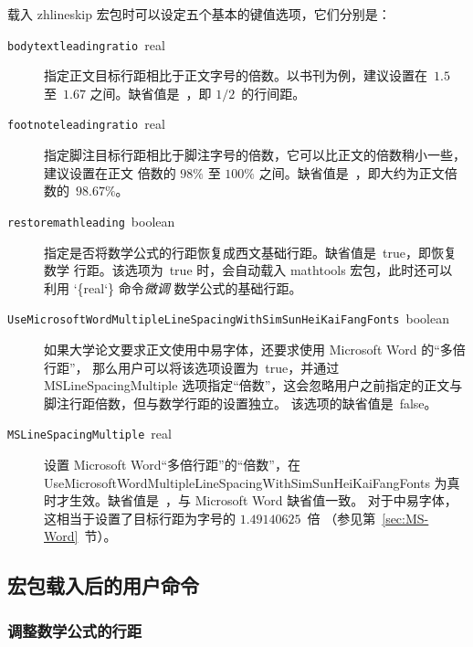 \documentclass[zihao=5,a4paper]{ctexart}
\makeatletter
\newcommand*\meta{}
\DeclareRobustCommand\meta[1]{%
     \ensuremath\langle
     \ifmmode \expandafter \nfss@text \fi
     {%
      \meta@font@select
      \edef\meta@hyphen@restore
        {\hyphenchar\the\font\the\hyphenchar\font}%
      \hyphenchar\font\m@ne
      \language\l@nohyphenation
      #1\/%
      \meta@hyphen@restore
     }\ensuremath\rangle
}
\def\meta@font@select{\itshape}
\newcommand*\cmd[1]{\cs{\expandafter\cmd@to@cs\string#1}}
\def\cmd@to@cs#1#2{\char\number`#2\relax}
\newcommand*\cs{}
\DeclareRobustCommand\cs[1]{\texttt{\char`\\#1}}
\newcommand\marg[1]{%
  {\ttfamily\char`\{}\meta{#1}{\ttfamily\char`\}}}
\newcommand\pkg[1]{{\normalfont\ttfamily#1}}
\newcommand\opt[1]{{\normalfont\ttfamily#1}}
\newcommand*\keyvaluedescription[2]{%
  \mbox{\texttt{#1} \meta{#2}}}
\makeatother
\begin{document}
载入 \pkg{zhlineskip} 宏包时可以设定五个基本的键值选项，它们分别是：
\begin{description}
\item[\keyvaluedescription{bodytextleadingratio}{real}]
指定正文目标行距相比于正文字号的倍数。以书刊为例，建议设置在~$1.5$ 至~$1.67$
之间。缺省值是~\opt{1.5}，即 $1/2$~的行间距。
\item[\keyvaluedescription{footnoteleadingratio}{real}]
指定脚注目标行距相比于脚注字号的倍数，它可以比正文的倍数稍小一些，建议设置在正文
倍数的 $98\%$ 至 $100\%$ 之间。缺省值是~\opt{1.48}，即大约为正文倍数的~$98.67\%$。
\item[\keyvaluedescription{restoremathleading}{boolean}]
指定是否将数学公式的行距恢复成西文基础行距。缺省值是~\opt{true}，即恢复数学
行距。该选项为~\opt{true} 时，会自动载入 \pkg{mathtools} 宏包，此时还可以
利用 \cmd{\SetMathEnvironmentSinglespace}\marg{real} 命令\emph{微调}
数学公式的基础行距。
\item[\keyvaluedescription{UseMicrosoftWordMultipleLineSpacingWithSimSunHeiKaiFangFonts}{boolean}]
如果大学论文要求正文使用中易字体，还要求使用 Microsoft Word 的“多倍行距”，
那么用户可以将该选项设置为~\opt{true}，并通过 \opt{MSLineSpacingMultiple}
选项指定“倍数”，这会忽略用户之前指定的正文与脚注行距倍数，但与数学行距的设置独立。
该选项的缺省值是~\opt{false}。
\item[\keyvaluedescription{MSLineSpacingMultiple}{real}]
设置 Microsoft Word“多倍行距”的“倍数”，在
\opt{UseMicrosoftWordMultipleLineSpacingWithSimSunHeiKaiFangFonts\!}
为真时才生效。缺省值是~\opt{1.15}，与 Microsoft Word 缺省值一致。
对于中易字体，这相当于设置了目标行距为字号的 $1.49140625$~倍
（参见第~\ref{sec:MS-Word}~节）。
\end{description}

\subsection{宏包载入后的用户命令}

\subsubsection{调整数学公式的行距}
\end{document}

